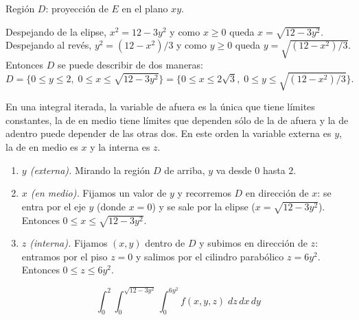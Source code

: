 \begin{respuesta}
    \begin{center}

    \small Región $D$: proyección de $E$ en el plano $xy$.
    \end{center}

    Despejando de la elipse, $x^2 = 12-3y^2$ y como $x\geq0$ queda $x=\sqrt{12-3y^2}$.
    Despejando al revés, $y^2 = (12-x^2)/3$ y como $y\geq 0$ queda
    $y=\sqrt{(12-x^2)/3}$. Entonces $D$ se puede describir de dos maneras:
    \[
        D = \{0\leq y\leq 2,\; 0\leq x\leq \sqrt{12-3y^2}\}
          = \{0\leq x\leq 2\sqrt{3},\; 0\leq y\leq \sqrt{(12-x^2)/3}\}.
    \]

    \bigskip
     En una integral iterada, la variable de afuera
    es la única que tiene límites constantes, la de en medio tiene límites que dependen
    sólo de la de afuera y la de adentro puede depender de las otras dos. En este orden
    la variable externa es $y$, la de en medio es $x$ y la interna es $z$.
    \begin{enumerate}
        \item \emph{$y$ (externa).} Mirando la región $D$ de arriba, $y$ va desde $0$
              hasta $2$.
        \item \emph{$x$ (en medio).} Fijamos un valor de $y$ y recorremos $D$ en dirección
              de $x$: se entra por el eje $y$ (donde $x=0$) y se sale por la elipse
              ($x=\sqrt{12-3y^2}$). Entonces $0\leq x\leq\sqrt{12-3y^2}$.
        \item \emph{$z$ (interna).} Fijamos $(x,y)$ dentro de $D$ y subimos en dirección de
              $z$: entramos por el piso $z=0$ y salimos por el cilindro parabólico
              $z=6y^2$. Entonces $0\leq z\leq 6y^2$.
    \end{enumerate}
    \[
        \boxed{\;\int_{0}^{2}\int_{0}^{\sqrt{12-3y^2}}\int_{0}^{6y^2} f(x,y,z)\; dz\,dx\,dy\;}
    \]


\end{respuesta}
